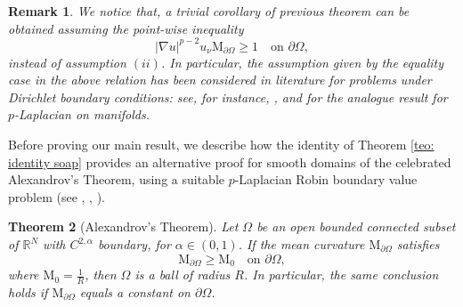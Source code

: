 \documentclass[10pt,a4paper, reqno]{amsart}
\numberwithin{equation}{section}
\newcommand{\R}{\mathbb{R}}
\newtheorem{teo}{Theorem}[section]
\newtheorem{rem}[teo]{Remark}
\begin{document}
    \begin{rem}
        We notice that, a trivial corollary of previous theorem can be obtained assuming the point-wise inequality
        \[
        |\nabla u|^{p-2} u_\nu \mathrm{M}_{\partial\Omega} \geq 1 \quad \text{on } \partial\Omega, 
        \]
        instead of assumption $(ii)$. In particular, the assumption given by the equality case in the above relation has been considered in literature for problems under Dirichlet boundary conditions: see, for instance, \cite[Thm.\,2.2]{mapo19}, \cite[Thm.\,1.1]{CoFe20} and \cite[Thm.\,4]{RuHuCh24} for the analogue result for $p$-Laplacian on manifolds.
    \end{rem}

    Before proving our main result, we describe how the identity of Theorem \ref{teo: identity soap} provides an alternative proof for smooth domains of the celebrated Alexandrov's Theorem, using a suitable $p$-Laplacian Robin boundary value problem (see \cite[Thm.\,2.2]{mapo19}, \cite[Thm.\,7]{gamo26}, \cite[Thm.\,3.1]{CoFe20}).
    
    \begin{teo}[Alexandrov’s Theorem]\label{thm alexandrov}
        Let $\Omega$ be an open bounded connected subset of $\R^N$ with $C^{2,\alpha}$ boundary, for $\alpha \in (0,1)$. If the mean curvature $\mathrm{M}_{\partial\Omega}$ satisfies 
        \begin{equation}\label{eq: cond M > M0}
            \mathrm{M}_{\partial\Omega} \geq \mathrm{M}_{0} \quad \text{on } \partial\Omega, 
        \end{equation}
        where $\mathrm{M}_0 = \frac{1}{R}$, then $\Omega$ is a ball of radius $R$. In particular, the same conclusion holds if $\mathrm{M}_{\partial\Omega}$ equals a constant on $\partial \Omega$.
    \end{teo}
\end{document}

